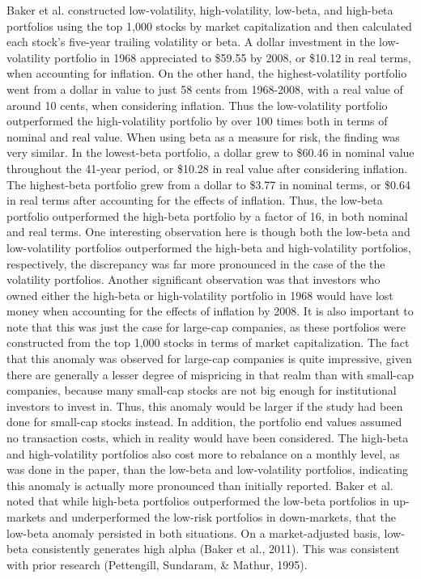 \documentclass[12pt,twoside]{reedthesis}
\theoremstyle{definition}
\theoremstyle{definition}
\theoremstyle{definition}
\theoremstyle{remark}
\begin{document}
Baker et al. constructed low-volatility, high-volatility, low-beta, and
high-beta portfolios using the top 1,000 stocks by market capitalization
and then calculated each stock's five-year trailing volatility or beta.
A dollar investment in the low-volatility portfolio in 1968 appreciated
to \$59.55 by 2008, or \$10.12 in real terms, when accounting for
inflation. On the other hand, the highest-volatility portfolio went from
a dollar in value to just 58 cents from 1968-2008, with a real value of
around 10 cents, when considering inflation. Thus the low-volatility
portfolio outperformed the high-volatility portfolio by over 100 times
both in terms of nominal and real value. When using beta as a measure
for risk, the finding was very similar. In the lowest-beta portfolio, a
dollar grew to \$60.46 in nominal value throughout the 41-year period,
or \$10.28 in real value after considering inflation. The highest-beta
portfolio grew from a dollar to \$3.77 in nominal terms, or \$0.64 in
real terms after accounting for the effects of inflation. Thus, the
low-beta portfolio outperformed the high-beta portfolio by a factor of
16, in both nominal and real terms. One interesting observation here is
though both the low-beta and low-volatility portfolios outperformed the
high-beta and high-volatility portfolios, respectively, the discrepancy
was far more pronounced in the case of the the volatility portfolios.
Another significant observation was that investors who owned either the
high-beta or high-volatility portfolio in 1968 would have lost money
when accounting for the effects of inflation by 2008. It is also
important to note that this was just the case for large-cap companies,
as these portfolios were constructed from the top 1,000 stocks in terms
of market capitalization. The fact that this anomaly was observed for
large-cap companies is quite impressive, given there are generally a
lesser degree of mispricing in that realm than with small-cap companies,
because many small-cap stocks are not big enough for institutional
investors to invest in. Thus, this anomaly would be larger if the study
had been done for small-cap stocks instead. In addition, the portfolio
end values assumed no transaction costs, which in reality would have
been considered. The high-beta and high-volatility portfolios also cost
more to rebalance on a monthly level, as was done in the paper, than the
low-beta and low-volatility portfolios, indicating this anomaly is
actually more pronounced than initially reported. Baker et al. noted
that while high-beta portfolios outperformed the low-beta portfolios in
up-markets and underperformed the low-risk portfolios in down-markets,
that the low-beta anomaly persisted in both situations. On a
market-adjusted basis, low-beta consistently generates high alpha (Baker
et al., 2011). This was consistent with prior research (Pettengill,
Sundaram, \& Mathur, 1995).
\end{document}
